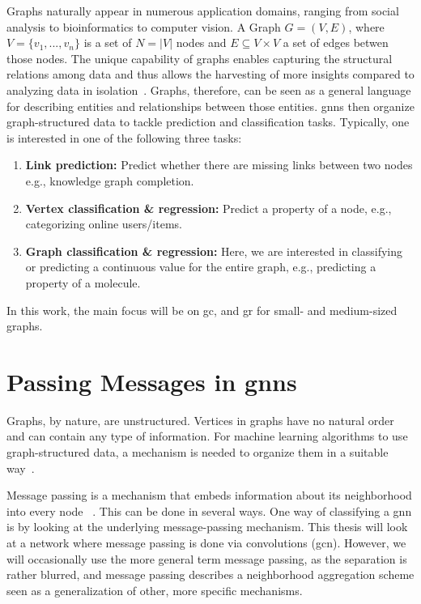 Graphs naturally appear in numerous application domains, ranging from social analysis to bioinformatics to computer vision.
A Graph $G = (V,E)$, where $V = \{v_{1},...,v_{n}\}$ is a set of $N =|V|$ nodes and $E \subseteq V\times V$ a set of edges betwen those nodes. The unique capability of graphs enables capturing the structural relations among data and thus allows the harvesting of more insights compared to analyzing data in isolation~\cite{Zhang19}. Graphs, therefore, can be seen as a general language for describing entities and relationships between those entities.
\Acfp{gnn} then organize graph-structured data to tackle prediction and classification tasks.
Typically, one is interested in one of the following three tasks:
\begin{enumerate}[label=\textbf{\arabic*.}]
    \item \textbf{Link prediction:}
          Predict whether there are missing links between two nodes
          e.g., knowledge graph completion.

    \item \textbf{Vertex classification \& regression:}
          Predict a property of a node, e.g., categorizing online users/items.

    \item \textbf{Graph classification \& regression:}
          Here, we are interested in classifying or predicting a continuous value for
          the entire graph, e.g., predicting a property of a molecule.
\end{enumerate}

In this work, the main focus will be on \ac{gc}, and \ac{gr} for small- and medium-sized graphs.

\section{Passing Messages in \Acsp*{gnn}}
\label{sec:related:message}

Graphs, by nature, are unstructured.
Vertices in graphs have no natural order and can contain any type of information.
For machine learning algorithms to use graph-structured data, a mechanism is needed to organize them in a
suitable way~\cite{Zhou2020a,Hamilton2017a,Zhang19}.


Message passing is a mechanism that embeds information about its neighborhood into every node ~\cite{Xu2019,Zhou2020a}.
This can be done in several ways.
One way of classifying a \ac{gnn} is by looking at the underlying message-passing mechanism.
This thesis will look at a network where message passing is done via convolutions (\acf{gcn}).
However, we will occasionally use the more general term message passing, as the separation is rather blurred, and message passing describes a neighborhood aggregation scheme seen as a generalization of other, more specific mechanisms.

